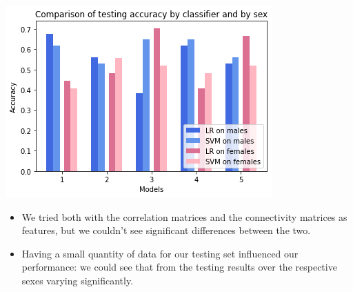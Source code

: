 \documentclass[landscape,a0paper,fontscale=0.285]{baposter} %
\newcommand{\compresslist}{ %
\setlength{\itemsep}{1pt}
\setlength{\parskip}{0pt}
\setlength{\parsep}{0pt}
}
\begin{document}
\begin{poster}
{\begin{multicols}{2}

\hspace{5.0em}
\begin{center}
	\includegraphics[width=1.0\linewidth]{histogram1}
\end{center}



\begin{itemize}\compresslist
\item We tried both with the correlation matrices and the connectivity matrices as features, but we couldn't see significant differences between the two.
\item Having a small quantity of data for our testing set influenced our performance: we could see that from the testing results over the respective sexes varying significantly.
\end{itemize}

\end{multicols}
}


\end{poster}
\end{document}
